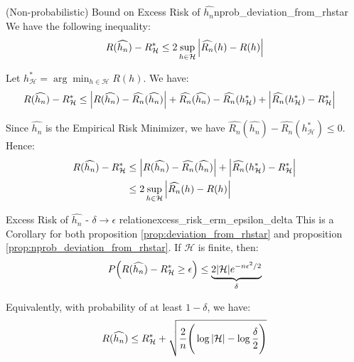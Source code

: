 \begin{proposition}{(Non-probabilistic) Bound on Excess Risk of $\widehat{h_n}$}{nprob_deviation_from_rhstar}
    We have the following inequality:
    \begin{align*}
        R(\widehat{h_n}) - R_\mathcal{H}^* \le 2\sup_{h\in\mathcal{H}} \Big| 
            \widehat{R_n}(h) - R(h)
         \Big|
    \end{align*}
\end{proposition}

\begin{proof*}
    Let $h_\mathcal{H}^* = \arg\min_{h\in\mathcal{H}}R(h)$. We have:
    \begin{align*}
        R(\widehat{h_n}) - R_\mathcal{H}^* 
            &\le 
                \Big| R(\widehat{h_n}) - \widehat{R_n}(\widehat{h_n}) \Big| 
                + \widehat{R_n}(\widehat{h_n}) - \widehat{R_n}(h_\mathcal{H}^*) 
                + \Big| \widehat{R_n}(h_\mathcal{H}^*) - R_\mathcal{H}^* \Big|
    \end{align*}

    \noindent Since $\widehat{h_n}$ is the Empirical Risk Minimizer, we have $\widehat{R_n}(\widehat{h_n}) - \widehat{R_n}(h_\mathcal{H}^*) \le 0$. Hence:
    \begin{align*}
        R(\widehat{h_n}) - R_\mathcal{H}^* 
            &\le   
                \Big| R(\widehat{h_n}) - \widehat{R_n}(\widehat{h_n}) \Big| 
                + \Big| \widehat{R_n}(h_\mathcal{H}^*) - R_\mathcal{H}^* \Big| \\
            &\le 
                2\sup_{h\in\mathcal{H}}\Big| 
                    \widehat{R_n}(h) - R(h)
                 \Big|
    \end{align*}
\end{proof*}

\begin{corollary}{Excess Risk of $\widehat{h_n}$ - $\delta \to \epsilon$ relation}{excess_risk_erm_epsilon_delta}
    This is a Corollary for both proposition \ref{prop:deviation_from_rhstar} and proposition \ref{prop:nprob_deviation_from_rhstar}. If $\mathcal{H}$ is finite, then:
    \begin{align*}
        P\Big( 
            R(\widehat{h_n}) - R_\mathcal{H}^* \ge \epsilon
         \Big) \le \underbrace{2|\mathcal{H}|e^{-n\epsilon^2/2}}_{\delta}
    \end{align*}

    \noindent Equivalently, with probability of at least $1-\delta$, we have:
    \begin{align*}
        R(\widehat{h_n}) \le R_\mathcal{H}^* + \sqrt{
            \frac{2}{n}\Bigg( \log|\mathcal{H}| - \log\frac{\delta}{2} \Bigg)
        }
    \end{align*}
\end{corollary}

